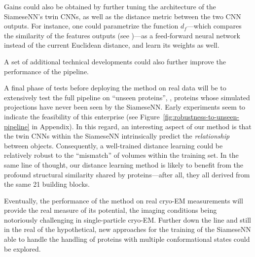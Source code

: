 Gains could also be obtained by further tuning the architecture of the SiameseNN's twin CNNs, as well as the distance metric between the two CNN outputs. For instance, one could parametrize the function $d_f$---which compares the similarity of the features outputs (see )---as a feed-forward neural network instead of the current Euclidean distance, and learn its weights as well.

A set of additional technical developments could also further improve the performance of the pipeline.  

A final phase of tests before deploying the method on real data will be to extensively test the full pipeline on ``unseen proteins'', \ie, proteins whose simulated projections have never been seen by the SiameseNN. Early experiments seem to indicate the feasibility of this enterprise (see Figure~\ref{fig:robustness-to-unseen-pipeline} in Appendix).
In this regard, an interesting aspect of our method is that the twin CNNs within the SiameseNN intrinsically predict the \textit{relationship} between objects. 
Consequently, a well-trained distance learning could be relatively robust to the ``mismatch'' of volumes within the training set.
In the same line of thought, our distance learning method is likely to benefit from the profound structural similarity shared by proteins---after all, they all derived from the same 21 building blocks.

Eventually, the performance of the method on real cryo-EM measurements will provide the real measure of its potential, the imaging conditions being notoriously challenging in single-particle cryo-EM. Further down the line and still in the real of the hypothetical, new approaches for the training of the SiameseNN able to handle the handling of proteins with multiple conformational states could be explored. 


